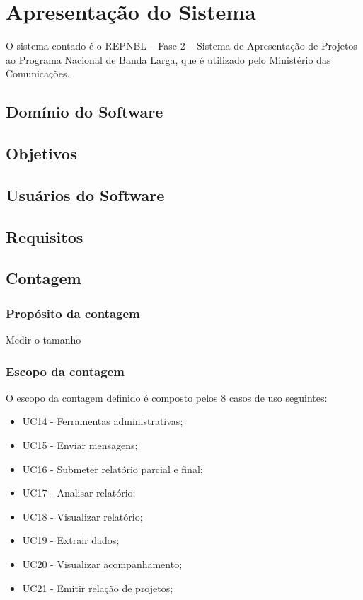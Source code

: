 \chapter{Apresentação do Sistema}

O sistema contado é o REPNBL – Fase 2 – Sistema de Apresentação de Projetos ao Programa Nacional de Banda Larga,
que é utilizado pelo Ministério das Comunicações.

\section{Domínio do Software}

\section{Objetivos}

\section{Usuários do Software}

\section{Requisitos}

\section{Contagem}

    \subsection{Propósito da contagem}
	    Medir o tamanho 

    \subsection{Escopo da contagem}
      
      O escopo da contagem definido é composto pelos 8 casos de uso seguintes:
	    
      \begin{itemize}
	      

	  \item UC14 - Ferramentas administrativas;
	  \item UC15 - Enviar mensagens;
	  \item UC16 - Submeter relatório parcial e final;
	  \item UC17 - Analisar relatório;
	  \item UC18 - Visualizar relatório;
	  \item UC19 - Extrair dados;
	  \item UC20 - Visualizar acompanhamento;
	  \item UC21 - Emitir relação de projetos;	

      \end{itemize}
      
